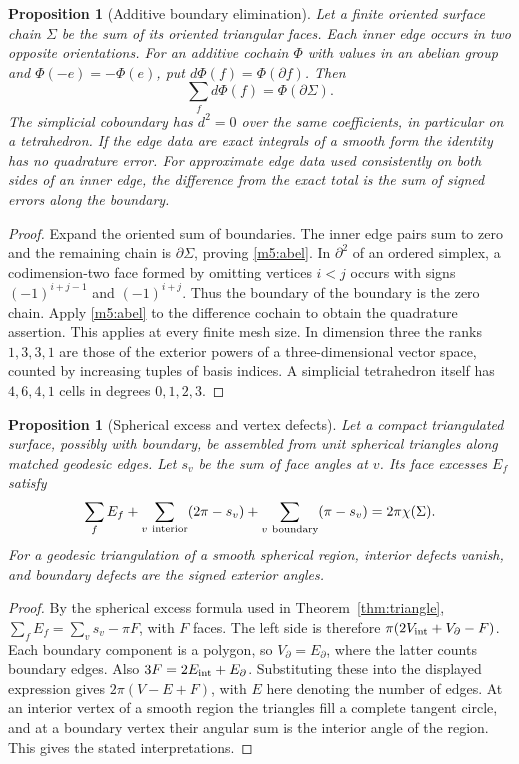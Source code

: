 \documentclass[11pt,reqno]{amsart}
\newtheorem{proposition}[theorem]{Proposition}
\theoremstyle{definition}
\theoremstyle{remark}
\numberwithin{equation}{section}
\begin{document}
\begin{proposition}[Additive boundary elimination]\label{m5:stokes}
Let a finite oriented surface chain \(\Sigma\) be the sum of its
oriented triangular faces. Each inner edge occurs in two opposite
orientations. For an additive cochain \(\Phi\) with values in an abelian
group and \(\Phi(-e)=-\Phi(e)\), put \(d\Phi(f)=\Phi(\partial f)\). Then
\begin{equation}\label{m5:abel}
 \sum_f d\Phi(f)=\Phi(\partial\Sigma).
\end{equation}
The simplicial coboundary has \(d^2=0\) over the same coefficients,
in particular on a tetrahedron. If the edge data are exact integrals
of a smooth form the identity has no quadrature error. For approximate
edge data used consistently on both sides of an inner edge, the
difference from the exact total is the sum of signed errors along
the boundary.
\end{proposition}
\begin{proof}
Expand the oriented sum of boundaries. The inner edge pairs sum to
zero and the remaining chain is \(\partial\Sigma\), proving
\eqref{m5:abel}. In \(\partial^2\) of an ordered simplex, a
codimension-two face formed by omitting vertices \(i<j\) occurs with
signs \((-1)^{i+j-1}\) and \((-1)^{i+j}\). Thus the boundary of the
boundary is the zero chain. Apply \eqref{m5:abel} to the difference
cochain to obtain the quadrature assertion. This applies at every
finite mesh size. In dimension three the ranks \(1,3,3,1\) are those
of the exterior powers of a three-dimensional vector space, counted
by increasing tuples of basis indices. A simplicial tetrahedron
itself has \(4,6,4,1\) cells in degrees \(0,1,2,3\).
\end{proof}

\begin{proposition}[Spherical excess and vertex defects]\label{m5:gb}
Let a compact triangulated surface, possibly with boundary, be assembled
from unit spherical triangles along matched geodesic edges. Let \(s_v\)
be the sum of face angles at \(v\). Its face excesses \(E_f\) satisfy
\begin{equation}\label{m5:gauss-bonnet}
 \sum_f E_f+\sum_{v\ {\rm interior}}(2\pi-s_v)
               +\sum_{v\ {\rm boundary}}(\pi-s_v)
 =2\pi\chi(\Sigma).
\end{equation}
For a geodesic triangulation of a smooth spherical region, interior
defects vanish, and boundary defects are the signed exterior angles.
\end{proposition}
\begin{proof}
By the spherical excess formula used in Theorem~\ref{thm:triangle},
\(\sum_f E_f=\sum_v s_v-\pi F\), with \(F\) faces. The left side
is therefore \(\pi(2V_{\rm int}+V_{\partial}-F)\). Each boundary
component is a polygon, so \(V_{\partial}=E_{\partial}\), where the
latter counts boundary edges. Also \(3F=2E_{\rm int}+E_{\partial}\).
Substituting these into the displayed expression gives
\(2\pi(V-E+F)\), with \(E\) here denoting the number of edges.
At an interior vertex of a smooth region the triangles fill a complete
tangent circle, and at a boundary vertex their angular sum is the
interior angle of the region. This gives the stated interpretations.
\end{proof}
\end{document}
